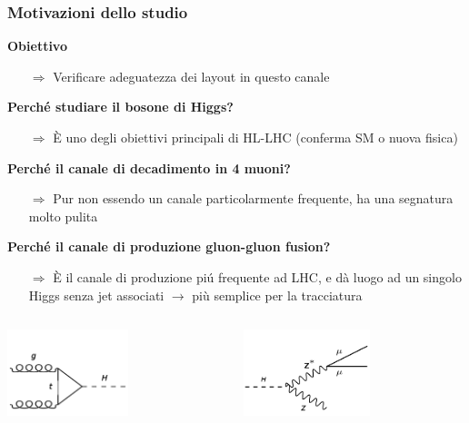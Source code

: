 \documentclass{beamer}
\begin{document}
\begin{frame}[t]
\frametitle{Motivazioni dello studio}

\textbf{\color{dred}Obiettivo}
\begin{itemize}
\item[\color{black}$\Rightarrow$] \small Verificare adeguatezza dei layout in questo canale
\end{itemize}
\medskip
\textbf{Perch\'e studiare il bosone di Higgs?}
\begin{itemize}
\item[\color{black}$\Rightarrow$] \small \`E uno degli obiettivi principali di HL-LHC (conferma SM o nuova fisica)
\end{itemize}

\textbf{Perch\'e il canale di decadimento in 4 muoni?}
\begin{itemize}
\item[\color{black}$\Rightarrow$] \small Pur non essendo un canale particolarmente frequente, ha una segnatura molto pulita
\end{itemize}

\textbf{Perch\'e il canale di produzione gluon-gluon fusion?}
\begin{itemize}
\item[\color{black}$\Rightarrow$] \small \`E il canale di produzione pi\'u frequente ad LHC, e d\`a luogo ad un singolo
Higgs senza jet associati $\rightarrow$ pi\`u semplice per la tracciatura
\end{itemize}

\begin{columns}
\begin{column}{.5\textwidth}
\centering
\includegraphics[width=.5\textwidth,height=2.5cm]{ggF2}
\end{column}
\begin{column}{.5\textwidth}
\centering
\includegraphics[width=.5\textwidth,height=2.5cm]{HZZ4mu_12}
\end{column}
\end{columns}

\end{frame}
\end{document}
